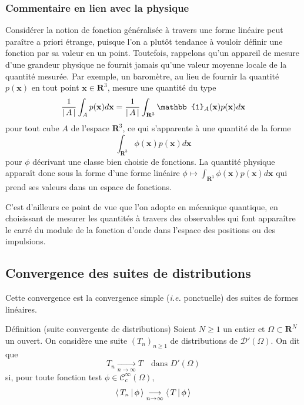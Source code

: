         \subsubsection{Commentaire en lien avec la physique}

        Considérer la notion de fonction généralisée à travers une forme linéaire peut paraître a priori étrange, puisque l’on a plutôt tendance à vouloir définir une fonction par sa valeur en un point. Toutefois, rappelons qu’un appareil de mesure d’une grandeur physique ne fournit jamais qu’une valeur moyenne locale de la quantité mesurée. Par exemple, un baromètre, au lieu de fournir la quantité $p(\mathbf{x})$ en tout point $\mathbf{x} \in \mathbf{R}^3$, mesure une quantité du type 
        \[ \frac{1}{\abs{A}} \int_A p(\mathbf{x}) d\mathbf{x} = \frac{1}{\abs{A}} \int_{\mathbf{R}^3} \mathbb{1}_{A}(\mathbf{x}) p(\mathbf{x}) d\mathbf{x} \]   
        pour tout cube $A$ de l’espace $\mathbf{R}^3$, ce qui s’apparente à une quantité de la forme 
        \[ \int_{\mathbf{R}^3} \phi(\mathbf{x}) p(\mathbf{x}) d\mathbf{x} \]    
        pour $\phi$ décrivant une classe bien choisie de fonctions. La quantité physique apparaît donc sous la forme d’une forme linéaire $\phi \mapsto \int_{\mathbf{R}^3} \phi(\mathbf{x}) p(\mathbf{x}) d\mathbf{x}$ qui prend ses valeurs dans un espace de fonctions.

        C’est d’ailleurs ce point de vue que l’on adopte en mécanique quantique, en choisissant de mesurer les quantités à travers des observables qui font apparaître le carré du module de la fonction d’onde dans l’espace des positions ou des impulsions.

    \subsection{Convergence des suites de distributions}

        Cette convergence est la convergence simple (\textit{i.e.} ponctuelle) des suites de formes linéaires.

        \begin{omed}{Définition (suite convergente de distributions)}
            Soient $N \geq 1$ un entier et $\Omega \subset \mathbf{R}^N$ un ouvert. On considère une suite $(T_n)_{n \geq 1}$ de distributions de $\mathcal{D}'(\Omega)$. On dit que 
            \[ T_n \underset{n \to \infty}{\longrightarrow} T \quad \text{dans } D'(\Omega) \]   
            si, pour toute fonction test $\phi \in \mathcal{C}_c^{\infty}(\Omega)$, 
            \[ \left< \, T_n \, \middle| \, \phi \, \right> \underset{n \to \infty}{\longrightarrow} \left< \, T \, \middle| \, \phi \, \right> \]
        \end{omed}

